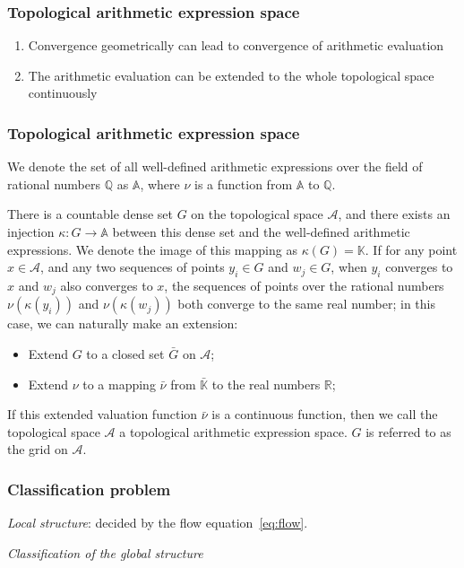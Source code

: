 \documentclass[aspectratio=169]{beamer}
\begin{document}
\begin{frame}
\frametitle{Topological arithmetic expression space}
\begin{enumerate}
    \item Convergence geometrically can lead to convergence of arithmetic evaluation
    \item The arithmetic evaluation can be extended to the whole topological space continuously
\end{enumerate}

\end{frame}

\begin{frame}
\frametitle{Topological arithmetic expression space}
We denote the set of all well-defined arithmetic expressions over the field of rational numbers $\mathbb{Q}$ as $\mathbb{A}$, where $\nu$ is a function from $\mathbb{A}$ to $\mathbb{Q}$.
\begin{definition}
There is a countable dense set $G$ on the topological space $\mathcal{A}$, and there exists an injection $\kappa: G \to \mathbb{A}$ between this dense set and the well-defined arithmetic expressions.
We denote the image of this mapping as $\kappa(G) = \mathbb{K}$. If for any point $x \in \mathcal{A}$,
and any two sequences of points $y_i \in G$ and $w_j \in G$, when $y_i$ converges to $x$ and $w_j$ also converges to $x$,
the sequences of points over the rational numbers $\nu(\kappa(y_i))$ and $\nu(\kappa(w_j))$ both converge to the same real number; in this case, we can naturally make an extension:
\begin{itemize}
\item Extend $G$ to a closed set $\bar{G}$ on $\mathcal{A}$;
\item Extend $\nu$ to a mapping $\bar{\nu}$ from $\bar{\mathbb{K}}$ to the real numbers $\mathbb{R}$;
\end{itemize}
If this extended valuation function $\bar{\nu}$ is a continuous function, then we call the topological space $\mathcal{A}$ a topological arithmetic expression space. $G$ is referred to as the grid on $\mathcal{A}$.
\end{definition}

\end{frame}

\begin{frame}
\frametitle{Classification problem}
\emph{Local structure}: decided by the flow equation~\ref{eq:flow}.

\emph{Classification of the global structure}

\end{frame}
\end{document}
